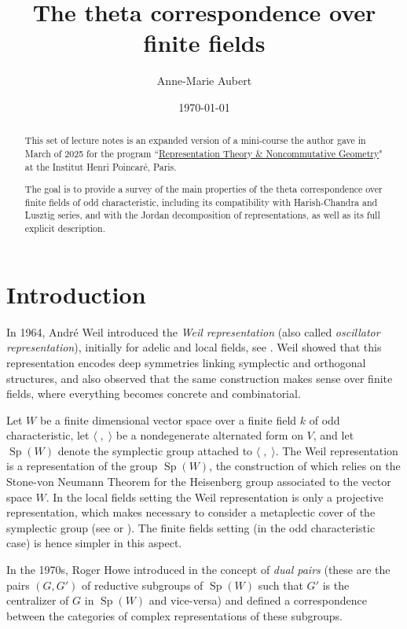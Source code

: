 \documentclass[12pt]{amsart}
\title[The theta correspondence over finite fields]{The theta correspondence over finite fields}
\author{Anne-Marie Aubert}
\date{\today}
\numberwithin{equation}{subsection}
\newcommand{\Sp}{\operatorname{Sp}}
\begin{document}
\maketitle
\begin{abstract} This set of lecture notes is an expanded version of a mini-course the author gave in March of 2025 for the program 
``\href{https://indico.math.cnrs.fr/event/10843/}{Representation Theory \& Noncommutative Geometry}" at the Institut Henri Poincaré, Paris.  

The goal is to provide a survey of the main properties of the theta correspondence over finite fields of odd characteristic, including its compatibility with Harish-Chandra and Lusztig series, and with the Jordan decomposition of representations,
as well as its full explicit description. 
\end{abstract}

\vspace*{12pt}


\tableofcontents

\section{Introduction} \label{sec:intro}

In 1964, André Weil introduced the \textit{Weil representation}  (also called \textit{oscillator representation}), initially for adelic and local fields, see \cite{Weil}. 
Weil showed that this representation encodes deep symmetries linking symplectic and orthogonal structures, and
also observed that the same construction makes sense over finite fields, where everything becomes concrete and combinatorial.

Let $W$ be a finite dimensional vector space over a finite field $k$ of odd characteristic, let $\langle\;,\;\rangle$ be a nondegenerate alternated form on $V$, and let $\Sp(W)$  denote the  symplectic group attached to 
$\langle\;,\;\rangle$. The  Weil representation is a representation of the group $\Sp(W)$, the construction of which relies on the Stone-von Neumann Theorem for the Heisenberg group associated to the vector space $W$. 
In  the local fields setting the Weil representation is only a projective representation, which makes necessary to consider a metaplectic  cover of the symplectic group (see \cite{Weil} or \cite{AP}). The finite fields setting (in the odd characteristic case) is hence simpler in this aspect. 

In the 1970s, Roger Howe introduced in \cite{Howe-finite,How} the concept of \textit{dual pairs} (these are the pairs $(G,G')$ of reductive subgroups of  $\Sp(W)$ such that $G'$ is the  centralizer of $G$ in $\Sp(W)$ and vice-versa) 
and defined a correspondence between the categories of complex representations of these subgroups. 
\end{document}
